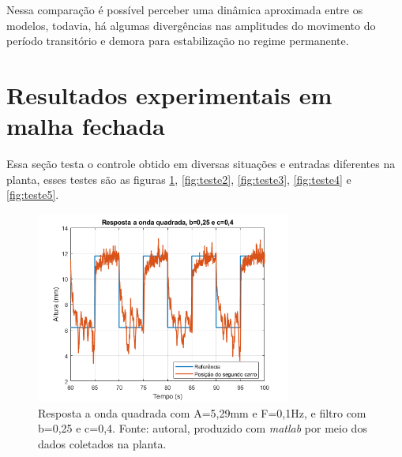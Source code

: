 \documentclass{ifacconf}
\begin{document}
Nessa comparação é possível perceber uma dinâmica aproximada entre os modelos, todavia, há algumas divergências nas amplitudes do movimento do período transitório
e demora para estabilização no regime permanente.  

\section{Resultados experimentais em malha fechada}

Essa seção testa o controle obtido em diversas situações e entradas diferentes na planta, esses testes são as figuras \ref{fig:teste1}, \ref{fig:teste2}, \ref{fig:teste3}, 
\ref{fig:teste4} e \ref{fig:teste5}.


\begin{figure}[!htb]
  \begin{center}
  \includegraphics[width=8.4cm]{figures/resultado_teste1.png}    %
  \caption{Resposta a onda quadrada com A=5,29mm e F=0,1Hz, e filtro com b=0,25 e c=0,4. Fonte: autoral, produzido com \textit{matlab} por meio dos dados coletados na planta.} 
  \label{fig:teste1}
  \end{center}
\end{figure}
\end{document}
